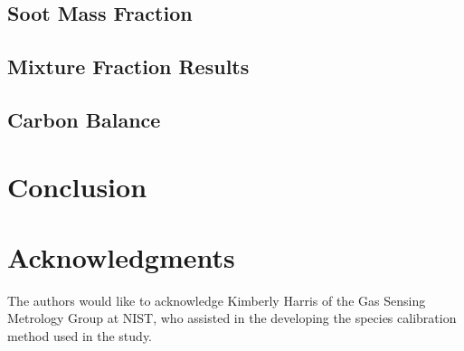 \documentclass[12pt]{article}
\newcommand*\chem[1]{\ensuremath{\mathrm{#1}}}
\begin{document}

\subsection{Soot Mass Fraction}
\label{ssec:Soot_Mass_Fraction}

\subsection{Mixture Fraction Results}
\label{ssec:Mixture_Fraction_Results}

\subsection{Carbon Balance}
\label{ssec:Carbon Balance}


\section{Conclusion}
\label{sec:Conclusion}

\section*{Acknowledgments}
\noindent The authors would like to acknowledge Kimberly Harris of the Gas Sensing Metrology Group at NIST, who assisted in the developing the species calibration method used in the study.
\end{document}
